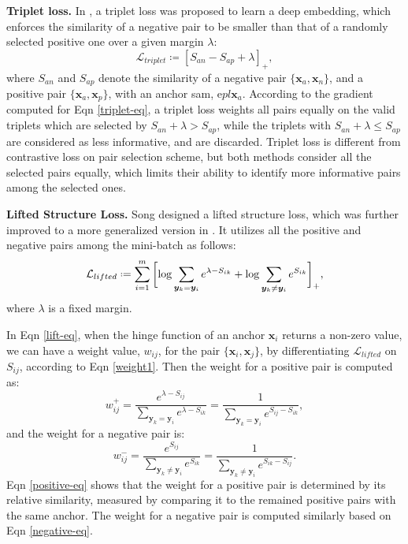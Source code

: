 \documentclass[10pt,twocolumn,letterpaper]{article}
\def\vx{{\bm{x}}}
\def\vy{{\bm{y}}}
\newcommand*{\defeq}{\mathrel{\vcenter{\baselineskip0.5ex \lineskiplimit0pt
			\hbox{\scriptsize.}\hbox{\scriptsize.}}}=}
\begin{document}
{\bf Triplet loss.}
In \cite{Hoffer2015DeepML}, a triplet loss was proposed to learn a deep embedding, which enforces the similarity of a negative pair to be smaller than that of a randomly selected positive one over a given margin $\lambda$:
\begin{equation}
\label{triplet-eq}
\mathcal{L}_{triplet} \coloneqq [S_{an} - S_{ap} + \lambda]_+,
\end{equation}
where $S_{an}$ and $S_{ap}$ denote the similarity of a negative pair $\{\vx_a, \vx_n\}$, and a positive pair $\{\vx_a, \vx_p\}$, with an anchor sam, e$pl\vx_a$.
According to the gradient computed for Eqn \ref{triplet-eq}, a triplet loss weights all pairs equally on the valid triplets which are selected by $ S_{an} + \lambda > S_{ap} $, while the triplets with $ S_{an} + \lambda \leqslant S_{ap} $ are considered as less informative, and are discarded. Triplet loss is different from contrastive loss on pair selection scheme, but both methods consider all the selected pairs equally, which limits their ability to identify more informative pairs among the selected ones.

{\bf Lifted Structure Loss.} Song \etal \cite{lifted-structured-loss} designed a lifted structure loss, which was further improved to  a more generalized version in \cite{in-defense}. It utilizes all the positive and negative pairs among the mini-batch as follows:
\begin{equation}
	\label{lift-eq}
	\mathcal{L}_{lifted} \defeq \sum_{i=1}^m \bigg[{ \log \sum_{\vy_k=\vy_i } e^ { \lambda -S_{ik}}}  +
	\log  \sum_{\vy_k \neq \vy_i } e^ {S_{ik}}
	\bigg]_+,
\end{equation}
where $\lambda$ is a fixed margin.

In Eqn \ref{lift-eq}, when the hinge function of an anchor $\vx_i$
returns a non-zero value, we can have a weight value,  $w_{ij}$, for the pair
$\{\vx_i, \vx_j\}$,  by differentiating $\mathcal{L}_{lifted}$ on $S_{ij}$, according to Eqn \ref{weight1}. Then the weight for a positive pair is computed as:
\begin{equation}
\label{positive-eq}
	w^{+}_{ij}=  \frac{e^{\lambda-S_{ij}} }{\sum_{\vy_k=\vy_i} e^{\lambda-S_{ik}}} = \frac{1 }{\sum_{\vy_k=\vy_i} e^{S_{ij}-S_{ik}}},
\end{equation}
and the weight for a negative pair is:
\begin{equation}
\label{negative-eq}
w^{-}_{ij}=  \frac{e^{S_{ij}} }{\sum_{\vy_k \neq \vy_i} e^{S_{ik}}} = \frac{1 }{\sum_{\vy_k \neq \vy_i} e^{S_{ik} - S_{ij}}} .
\end{equation}
Eqn \ref{positive-eq} shows that the weight for a positive pair is determined by its relative similarity, measured by comparing it to the remained positive pairs with the same anchor. The weight for a negative pair is computed similarly based on Eqn \ref{negative-eq}.
\end{document}
